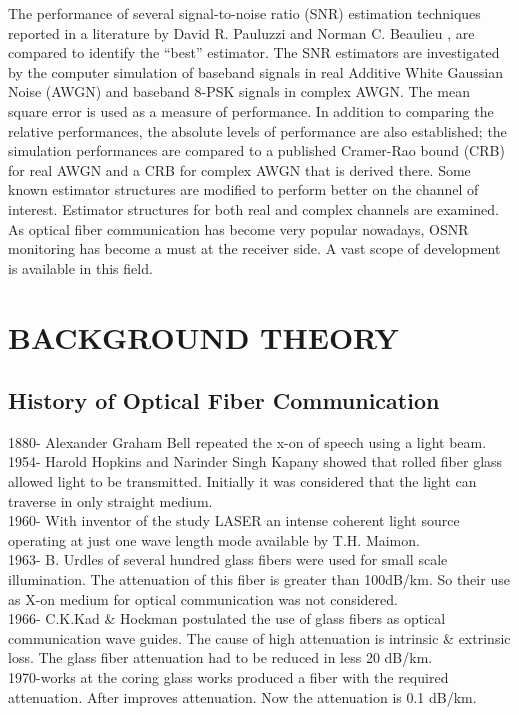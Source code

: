 \documentclass[12pt]{report}
\begin{document}
	The performance of several signal-to-noise ratio (SNR) estimation techniques reported in a literature by David R. Pauluzzi and Norman C. Beaulieu \cite{compare}, are compared to identify the “best” estimator. The SNR estimators are investigated by the computer simulation of baseband signals in real Additive White Gaussian Noise (AWGN) and baseband 8-PSK signals in complex AWGN. The mean square error is used as a measure of performance. In addition to comparing the relative performances, the absolute levels of performance are also established; the simulation performances are compared to a published Cramer-Rao bound (CRB) for real AWGN and a CRB for complex AWGN that is derived there. Some known estimator structures are modified to perform better on the channel of interest. Estimator structures for both real and complex channels are examined. 
	As optical fiber communication has become very popular nowadays, OSNR monitoring has become a must at the receiver side. A vast scope of development is available in this field.

	
	\chapter{BACKGROUND THEORY}

	\section{History of Optical Fiber Communication}
	1880- Alexander Graham Bell repeated the x-on of speech using a light beam.\\
	1954- Harold Hopkins and Narinder Singh Kapany showed that rolled fiber glass allowed light to be transmitted. Initially it was considered that the light can traverse in only straight medium.\\
	1960- With inventor of the study LASER an intense coherent light source operating at just one wave length mode available by T.H. Maimon.\\ 
	1963- B. Urdles of several hundred glass fibers were used for small scale illumination. The attenuation of this fiber is greater than 100dB/km. So their use as X-on medium for optical communication was not considered.\\ 
	1966- C.K.Kad \& Hockman postulated the use of glass fibers as optical communication wave guides. The cause of high attenuation is intrinsic \& extrinsic loss. The glass fiber attenuation had to be reduced in less 20 dB/km.\\ 
	1970-works at the coring glass works produced a fiber with the required attenuation. After improves attenuation. Now the attenuation is 0.1 dB/km.
\end{document}
